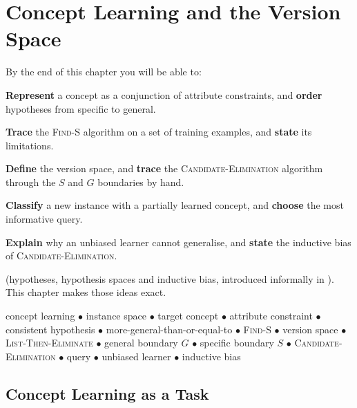 \chapter{Concept Learning and the Version Space}\label{ch:concept}

\begin{outcomes}
By the end of this chapter you will be able to:
\begin{tight}
  \item \textbf{Represent} a concept as a conjunction of attribute constraints,
        and \textbf{order} hypotheses from specific to general.
  \item \textbf{Trace} the \textsc{Find-S} algorithm on a set of training
        examples, and \textbf{state} its limitations.
  \item \textbf{Define} the version space, and \textbf{trace} the
        \textsc{Candidate-Elimination} algorithm through the $S$ and $G$
        boundaries by hand.
  \item \textbf{Classify} a new instance with a partially learned concept, and
        \textbf{choose} the most informative query.
  \item \textbf{Explain} why an unbiased learner cannot generalise, and
        \textbf{state} the inductive bias of \textsc{Candidate-Elimination}.
\end{tight}
\end{outcomes}

\begin{prereq}
 (hypotheses, hypothesis spaces and inductive bias,
introduced informally in ). This chapter makes those
ideas exact.
\end{prereq}

\begin{keyterms}
concept learning $\bullet$ instance space $\bullet$ target concept $\bullet$
attribute constraint $\bullet$ consistent hypothesis $\bullet$
more-general-than-or-equal-to $\bullet$ \textsc{Find-S} $\bullet$ version space
$\bullet$ \textsc{List-Then-Eliminate} $\bullet$ general boundary $G$ $\bullet$
specific boundary $S$ $\bullet$ \textsc{Candidate-Elimination} $\bullet$ query
$\bullet$ unbiased learner $\bullet$ inductive bias
\end{keyterms}

\section{Concept Learning as a Task}

